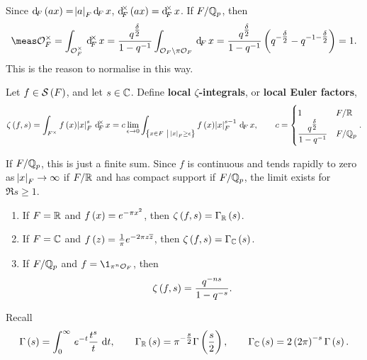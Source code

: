 Since $ \dF\br{ax} = \abs{a}_F\dF x $, $ \dF^\times\br{ax} = \dF^\times x $. If $ F / \mathbb{Q}_p $, then
$$ \meas \OOO_F^\times = \intFX[\OOO_F^\times]{}{x} = \dfrac{q^{\tfrac{\delta}{2}}}{1 - q^{-1}}\intF[\OOO_F \setminus \pi\OOO_F]{}{x} = \dfrac{q^{\tfrac{\delta}{2}}}{1 - q^{-1}}\br{q^{-\tfrac{\delta}{2}} - q^{-1 - \tfrac{\delta}{2}}} = 1. $$
This is the reason to normalise in this way.

\begin{definition*}
Let $ f \in \SSS\br{F} $, and let $ s \in \mathbb{C} $. Define \textbf{local $ \zeta $-integrals}, or \textbf{local Euler factors},
$$ \zeta\br{f, s} = \intFX{f\br{x}\abs{x}_F^s}{x} = c\lim_{\epsilon \to 0} \intF[\cbr{x \in F \st \abs{x}_F \ge \epsilon}]{f\br{x}\abs{x}_F^{s - 1}}{x}, \qquad c =
\begin{cases}
1 & F / \RR \\
\dfrac{q^{\tfrac{\delta}{2}}}{1 - q^{-1}} & F / \QQ_p
\end{cases}.
$$
\end{definition*}

If $ F / \mathbb{Q}_p $, this is just a finite sum. Since $ f $ is continuous and tends rapidly to zero as $ \abs{x}_F \to \infty $ if $ F / \mathbb{R} $ and has compact support if $ F / \mathbb{Q}_p $, the limit exists for $ \Re s \ge 1 $.

\begin{proposition}
\hfill
\begin{enumerate}
\item If $ F = \mathbb{R} $ and $ f\br{x} = e^{-\pi x^2} $, then $ \zeta\br{f, s} = \Gamma_\RR\br{s} $.
\item If $ F = \mathbb{C} $ and $ f\br{z} = \tfrac{1}{\pi}e^{-2\pi z\overline{z}} $, then $ \zeta\br{f, s} = \Gamma_\CC\br{s} $.
\item If $ F / \mathbb{Q}_p $ and $ f = \1_{\pi^n\OOO_F} $, then
$$ \zeta\br{f, s} = \dfrac{q^{-ns}}{1 - q^{-s}}. $$
\end{enumerate}
\end{proposition}

Recall
$$ \Gamma\br{s} = \intd{0}{\infty}{e^{-t}\dfrac{t^s}{t}}{t}, \qquad \Gamma_\RR\br{s} = \pi^{-\tfrac{s}{2}}\Gamma\br{\dfrac{s}{2}}, \qquad \Gamma_\CC\br{s} = 2\br{2\pi}^{-s}\Gamma\br{s}. $$

